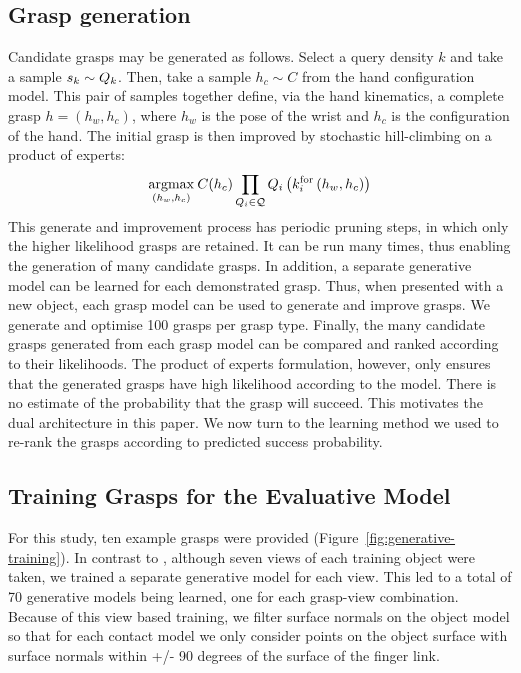 \subsection{Grasp generation}
Candidate grasps may be generated as follows. Select a query density $k$ and take a sample  $s_k \sim Q_{k}$. Then, take a sample $h_c \sim C$ from the hand configuration model. This pair of samples together define, via the hand kinematics, a complete grasp $h=(h_w,h_c)$, where $h_w$ is the pose of the wrist and $h_c$ is the configuration of the hand. The initial grasp is then improved by stochastic hill-climbing on a product of experts:
\begin{equation}
\argmax{(h_w, h_c)} \hc(h_c) \prod_{\qd_i \in \mathcal{Q}} \qd_i\left(k_{i}^{\mathrm{for}}\left(h_w, h_c\right)\right)
\label{eq:grasping.product}
\end{equation}
This generate and improvement process has periodic pruning steps, in which only the higher likelihood grasps are retained. It can be run many times, thus enabling the generation of many candidate grasps. In addition, a separate generative model can be learned for each demonstrated grasp. Thus, when presented with a new object, each grasp model can be used to generate and improve grasps. We generate and optimise 100 grasps per grasp type. Finally, the many candidate grasps generated from each grasp model can be compared and ranked according to their likelihoods. The product of experts formulation, however, only ensures that the generated grasps have high likelihood according to the model. There is no estimate of the probability that the grasp will succeed. This motivates the dual architecture in this paper. We now turn to the learning method we used to re-rank the grasps according to predicted success probability. 

\subsection{Training Grasps for the Evaluative Model}

For this study, ten example grasps were provided (Figure~\ref{fig:generative-training}). In contrast to \cite{kopicki2015ijrr}, although seven views of each training object were taken, we trained a separate generative model for each view. This led to a total of 70 generative models being learned, one for each grasp-view combination. Because of this view based training, we filter surface normals on the object model so that for each contact model we only consider points on the object surface with surface normals within +/- 90 degrees of the surface of the finger link. %
